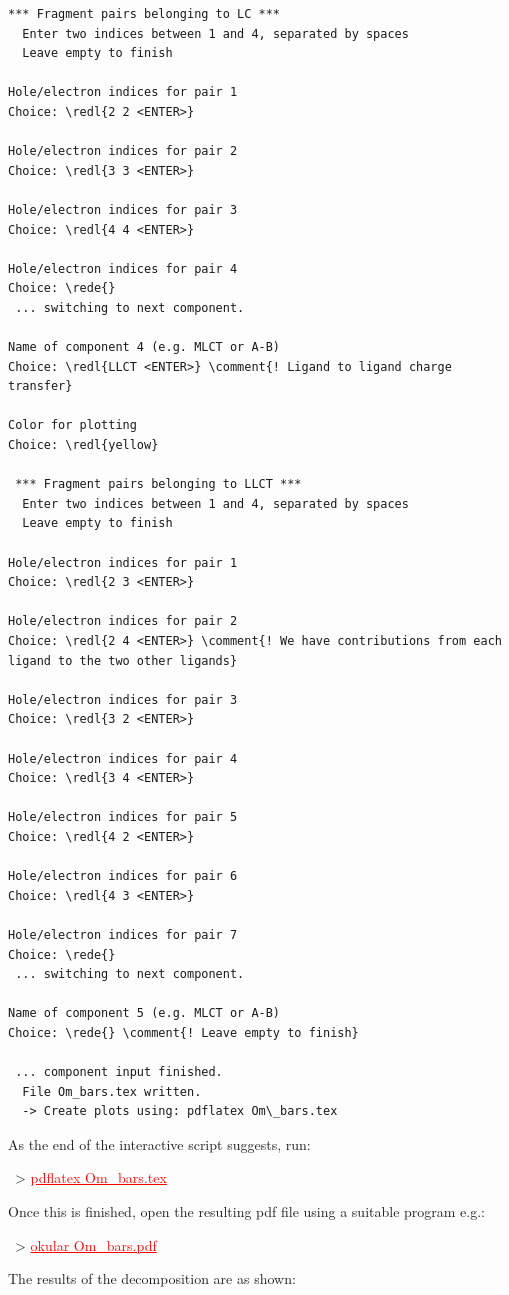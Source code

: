 \documentclass[DIV=12,headings=normal]{scrartcl}
\newcommand{\comment}[1]{\textcolor{blue}{#1}}
\newcommand{\redl}[1]{{\textcolor{red}{\underline{#1}}}}
\newcommand{\rede}[1]{\redl{#1 <ENTER>}}
\newcommand{\comm}[1]{
\small
~> \redl{#1}
\normalsize
}
\begin{document}
\begin{Verbatim}[commandchars=\\\{\}]
 *** Fragment pairs belonging to LC ***
  Enter two indices between 1 and 4, separated by spaces
  Leave empty to finish

Hole/electron indices for pair 1
Choice: \redl{2 2 <ENTER>}

Hole/electron indices for pair 2
Choice: \redl{3 3 <ENTER>}

Hole/electron indices for pair 3
Choice: \redl{4 4 <ENTER>}

Hole/electron indices for pair 4
Choice: \rede{}
 ... switching to next component.
 
Name of component 4 (e.g. MLCT or A-B)
Choice: \redl{LLCT <ENTER>} \comment{! Ligand to ligand charge transfer}

Color for plotting
Choice: \redl{yellow}

 *** Fragment pairs belonging to LLCT ***
  Enter two indices between 1 and 4, separated by spaces
  Leave empty to finish

Hole/electron indices for pair 1
Choice: \redl{2 3 <ENTER>}

Hole/electron indices for pair 2
Choice: \redl{2 4 <ENTER>} \comment{! We have contributions from each ligand to the two other ligands}

Hole/electron indices for pair 3
Choice: \redl{3 2 <ENTER>}

Hole/electron indices for pair 4
Choice: \redl{3 4 <ENTER>}

Hole/electron indices for pair 5
Choice: \redl{4 2 <ENTER>}

Hole/electron indices for pair 6
Choice: \redl{4 3 <ENTER>}

Hole/electron indices for pair 7
Choice: \rede{}
 ... switching to next component.

Name of component 5 (e.g. MLCT or A-B)
Choice: \rede{} \comment{! Leave empty to finish}

 ... component input finished.
  File Om_bars.tex written.
  -> Create plots using: pdflatex Om\_bars.tex
\end{Verbatim}
\normalsize

As the end of the interactive script suggests, run:
\comm{pdflatex Om\_bars.tex}

Once this is finished, open the resulting pdf file using a suitable program e.g.:

\comm{okular Om\_bars.pdf}

The results of the decomposition are as shown:\\
\end{document}
